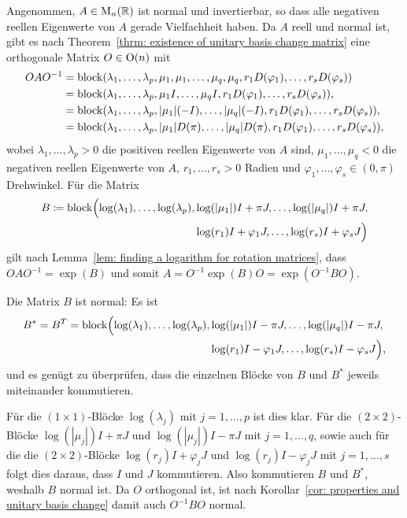 \documentclass[a4paper, 10pt, numbers=noenddot]{scrartcl}
\begin{document}
Angenommen, $A \in \operatorname{M}_n(\mathbb{R})$ ist normal und invertierbar, so dass alle negativen reellen Eigenwerte von $A$ gerade Vielfachheit haben.
Da $A$ reell und normal ist, gibt es nach Theorem~\ref{thrm: existence of unitary basis change matrix} eine orthogonale Matrix $O \in \operatorname{O}(n)$ mit
\begin{align*}
      O A O^{-1}
  &=  \operatorname{\operatorname{block}}( \lambda_1, \dotsc, \lambda_p,
              \mu_1, \mu_1, \dotsc, \mu_q, \mu_q,
              r_1 D(\varphi_1), \dotsc, r_s D(\varphi_s)  )   \\
  &=  \operatorname{\operatorname{block}}( \lambda_1, \dotsc, \lambda_p,
              \mu_1 I, \dotsc, \mu_q I,
              r_1 D(\varphi_1), \dotsc, r_s D(\varphi_s)  ),  \\
  &=  \operatorname{\operatorname{block}}( \lambda_1, \dotsc, \lambda_p,
              |\mu_1| (-I), \dotsc, |\mu_q| (-I),
              r_1 D(\varphi_1), \dotsc, r_s D(\varphi_s)  ),  \\
  &=  \operatorname{\operatorname{block}}( \lambda_1, \dotsc, \lambda_p,
              |\mu_1| D(\pi), \dotsc, |\mu_q| D(\pi),
              r_1 D(\varphi_1), \dotsc, r_s D(\varphi_s)  ),
\end{align*}
wobei $\lambda_1, \dotsc, \lambda_p > 0$ die positiven reellen Eigenwerte von $A$ sind, $\mu_1, \dotsc, \mu_q < 0$ die negativen reellen Eigenwerte von $A$, $r_1, \dotsc, r_s > 0$ Radien und $\varphi_1, \dotsc, \varphi_s \in (0,\pi)$ Drehwinkel.
Für die Matrix
\begin{align*}
  B
  \coloneqq \operatorname{\operatorname{block}}\Bigl(  \log(\lambda_1), \dotsc, \log(\lambda_p),
                         &\log(|\mu_1|) I + \pi J, \dotsc, \log(|\mu_q|) I + \pi J, \\
                         &\log(r_1) I + \varphi_1 J, \dotsc, \log(r_s) I + \varphi_s J                \Bigr)
\end{align*}
gilt nach Lemma~\ref{lem: finding a logarithm for rotation matrices}, dass $O A O^{-1} = \exp(B)$ und somit $A = O^{-1} \exp(B) O = \exp(O^{-1} B O)$.

Die Matrix $B$ ist normal:
Es ist
\begin{align*}
    B^*
  = B^T
  = \operatorname{\operatorname{block}}\Bigl(  \log(\lambda_1), \dotsc, \log(\lambda_p),
                 &\log(|\mu_1|) I - \pi J, \dotsc, \log(|\mu_q|) I - \pi J, \\
                 & \log(r_1) I - \varphi_1 J, \dotsc, \log(r_s) I - \varphi_s J                \Bigr),
\end{align*}
und es genügt zu überprüfen, dass die einzelnen Blöcke von $B$ und $B^*$ jeweils miteinander kommutieren.

Für die $(1 \times 1)$-Blöcke $\log(\lambda_j)$ mit $j = 1, \dotsc, p$ ist dies klar.
Für die $(2 \times 2)$-Blöcke $\log(|\mu_j|) I + \pi J$ und $\log(|\mu_j|) I - \pi J$ mit $j = 1, \dotsc, q$, sowie auch für die die $(2 \times 2)$-Blöcke $\log(r_j) I + \varphi_j J$ und $\log(r_j) I - \varphi_j J$ mit $j = 1, \dotsc, s$ folgt dies daraus, dass $I$ und $J$ kommutieren.
Also kommutieren $B$ und $B^*$, weshalb $B$ normal ist.
Da $O$ orthogonal ist, ist nach Korollar~\ref{cor: properties and unitary basis change} damit auch $O^{-1} B O$ normal.
\end{document}

